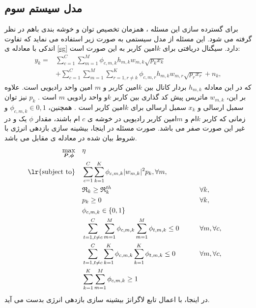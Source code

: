 \subsection{مدل سیستم سوم}
برای گسترده سازی این مسئله ، همزمان تخصیص توان و خوشه بندی باهم در نظر گرفته می شود.
این مسئله از مدل سیستمی به صورت زیر استفاده می نماید که تفاوت اندکی با معادله ی \eqref{sg} دارد.
سیگنال دریافتی برای $k$امین کاربر به این صورت است:
\begin{equation} \label{sg1}
\begin{aligned}
y_{k} =& \sum_{c=1}^C \sum_{m=1}^M  \phi_{c,m,k}h_{m,k}w_{m,k} \sqrt{p_k x_k} \\
&+ \sum_{c=1}^C \sum_{m=1}^M \sum_{r=1 ,r \neq k}^K  \phi_{c,m,r}h_{m,k}w_{m,r} \sqrt{p_r x_r} + n_k,
\end{aligned}	
\end{equation}
که در این معادله  $h_{m,k}$  بردار کانال بین $k$امین کاربر و $m$ امین  واحد رادیویی است.
علاوه بر این، $w_{m,k}$ ماتریس پیش کد گذاری بین کاربر $k$و واحد رادویی $m$ است . 
$p_k$ 
نیز توان سمبل ارسالی و
$x_k$
سمبل ارسالی برای $k$امین کاربر است .
همچنین، 
$ \phi_{c,m,k} \in {0,1}$ 
و زمانی که کاربر $k$ام و  $m$امین کاربر رادیویی در خوشه ی $c$ ام باشند، مقدار $\phi$ یک و در غیر این صورت صفر می باشد.
صورت مسئله در اینجا، بیشینه سازی بازدهی انرژی با شروط بیان شده در معادله ی  مقابل می باشد.
\begin{equation}
\begin{aligned}
\max\limits_{\boldsymbol{P},\boldsymbol{\phi}}   \quad &   \eta\\
\text{\lr{subject to}} \quad  & \sum_{c=1}^C \sum_{k=1}^K  \phi_{c,m,k}|w_{m,k}|^2 p_k , \forall m,   \\
&\mathfrak{R}_{k} \geq  \mathfrak{R}_{k}^{th} && \qquad  \forall k, \\
&p_{k}  \geq 0                                  &&\qquad  \forall k, \\
& \phi_{c,m,k} \in \{0,1\} \\
 &\sum_{t=1, t \neq c}^C \sum_{m=1}^M  \phi_{c,m,k}\sum_{m=1}^M \phi_{t,m,k} \leq 0    &&\qquad    \forall m  , \forall c, \\
  &\sum_{t=1, t \neq c}^C \sum_{k=1}^K  \phi_{c,m,k}\sum_{k=1}^K \phi_{t,m,k} \leq 0      &&\qquad      \forall m  , \forall c,\\
  &\sum_{k=1}^K \sum_{m=1}^M  \phi_{c,m,k} \geq 1\\
\end{aligned}	
\end{equation}
در اینجا، با اعمال تابع لاگرانژ بیشینه سازی بازدهی انرژی بدست می آید\cite{jointcluster,pcluster, jue}.